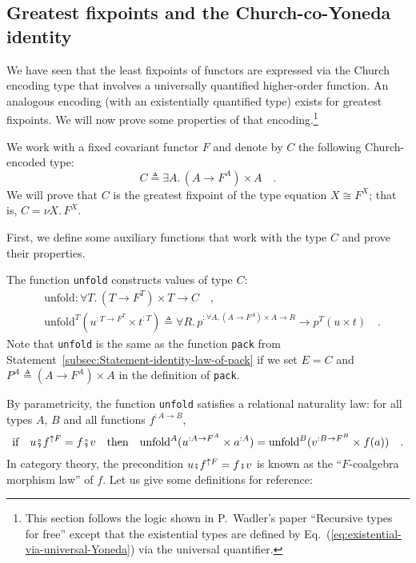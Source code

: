 \subsection{Greatest fixpoints and the Church-co-Yoneda identity\label{subsec:The-greatest-fixpoints-and-Church-co-Yoneda}}

We have seen that the least fixpoints of functors are expressed via
the Church encoding type that involves a universally quantified higher-order
function. An analogous encoding (with an existentially quantified
type) exists for greatest fixpoints. We will now prove some properties
of that encoding.\footnote{This section follows the logic shown in P.~Wadler\textsf{'}s paper \textsf{``}Recursive
types for free\textsf{''} except that the existential types are defined by
Eq.~(\ref{eq:existential-via-universal-Yoneda}) via the universal
quantifier.}

We work with a fixed covariant functor $F$ and denote by $C$ the
following Church-encoded type:
\[
C\triangleq\exists A.\,(A\rightarrow F^{A})\times A\quad.
\]
We will prove that $C$ is the greatest fixpoint of the type equation
$X\cong F^{X}$; that is, $C=\nu X.\,F^{X}$. 

First, we define some auxiliary functions that work with the type
$C$ and prove their properties.

The function \lstinline!unfold! constructs values of type $C$:
\begin{align*}
 & \text{unfold}:\forall T.\,(T\rightarrow F^{T})\times T\rightarrow C\quad,\\
 & \text{unfold}^{T}(u^{:T\rightarrow F^{T}}\times t^{:T})\triangleq\forall R.\,p^{:\forall A.\,(A\rightarrow F^{A})\times A\rightarrow R}\rightarrow p^{T}(u\times t)\quad.
\end{align*}
Note that \lstinline!unfold! is the same as the function \lstinline!pack!
from Statement~\ref{subsec:Statement-identity-law-of-pack} if we
set $E=C$ and $P^{A}\triangleq(A\rightarrow F^{A})\times A$ in the
definition of \lstinline!pack!.

By parametricity, the function \lstinline!unfold! satisfies a relational
naturality law: for all types $A$, $B$ and all functions $f^{:A\rightarrow B}$,
\begin{equation}
\text{if}\quad u\bef f^{\uparrow F}=f\bef v\quad\text{then}\quad\text{unfold}^{A}(u^{:A\rightarrow F^{A}}\times a^{:A})=\text{unfold}^{B}(v^{:B\rightarrow F^{B}}\times f(a))\quad.\label{eq:relational-naturality-law-of-unfold}
\end{equation}
In category theory, the precondition $u\bef f^{\uparrow F}=f\bef v$
is known as the \textsf{``}$F$-coalgebra morphism law\textsf{''} of $f$. Let us
give some definitions for reference:

